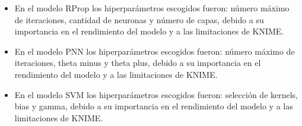 \begin{itemize}
	\item En el modelo RProp los hiperparámetros escogidos fueron: número máximo de iteraciones, cantidad de neuronas y número de capas, debido a su importancia en el rendimiento del modelo y a las limitaciones de KNIME.
	\item En el modelo PNN los hiperparámetros escogidos fueron: número máximo de iteraciones, theta minus y theta plus, debido a su importancia en el rendimiento del modelo y a las limitaciones de KNIME.
	\item En el modelo SVM los hiperparámetros escogidos fueron: selección de kernels, bias y gamma, debido a su importancia en el rendimiento del modelo y a las limitaciones de KNIME.
\end{itemize}


\pagebreak


